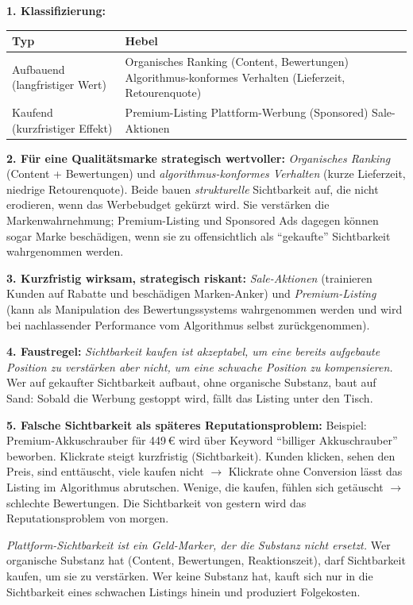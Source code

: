 \documentclass[11pt,a4paper,oneside]{article}
\begin{document}
\begin{loesungbox}
\textbf{1. Klassifizierung:}

\smallskip
\begin{tabularx}{\linewidth}{@{}lX@{}}
\toprule
\textbf{Typ} & \textbf{Hebel} \\
\midrule
Aufbauend (langfristiger Wert)  & Organisches Ranking (Content, Bewertungen) \textperiodcentered{} Algorithmus-konformes Verhalten (Lieferzeit, Retourenquote) \\
\midrule
Kaufend (kurzfristiger Effekt)  & Premium-Listing \textperiodcentered{} Plattform-Werbung (Sponsored) \textperiodcentered{} Sale-Aktionen \\
\bottomrule
\end{tabularx}

\textbf{2. Für eine Qualitätsmarke strategisch wertvoller:}
\emph{Organisches Ranking} (Content + Bewertungen) und \emph{algorithmus-konformes Verhalten} (kurze Lieferzeit, niedrige Retourenquote). Beide bauen \emph{strukturelle} Sichtbarkeit auf, die nicht erodieren, wenn das Werbebudget gekürzt wird. Sie verstärken die Markenwahrnehmung; Premium-Listing und Sponsored Ads dagegen können sogar Marke beschädigen, wenn sie zu offensichtlich als ``gekaufte'' Sichtbarkeit wahrgenommen werden.

\textbf{3. Kurzfristig wirksam, strategisch riskant:}
\emph{Sale-Aktionen} (trainieren Kunden auf Rabatte und beschädigen Marken-Anker) und \emph{Premium-Listing} (kann als Manipulation des Bewertungssystems wahrgenommen werden \textendash{} und wird bei nachlassender Performance vom Algorithmus selbst zurückgenommen).

\textbf{4. Faustregel:}
\emph{Sichtbarkeit kaufen ist akzeptabel, um eine bereits aufgebaute Position zu verstärken \textendash{} aber nicht, um eine schwache Position zu kompensieren.} Wer auf gekaufter Sichtbarkeit aufbaut, ohne organische Substanz, baut auf Sand: Sobald die Werbung gestoppt wird, fällt das Listing unter den Tisch.

\textbf{5. Falsche Sichtbarkeit als späteres Reputationsproblem:}
Beispiel: Premium-Akkuschrauber für 449\,\euro{} wird über Keyword ``billiger Akkuschrauber'' beworben. Klickrate steigt kurzfristig (Sichtbarkeit). Kunden klicken, sehen den Preis, sind enttäuscht, viele kaufen nicht $\rightarrow$ Klickrate ohne Conversion lässt das Listing im Algorithmus abrutschen. Wenige, die kaufen, fühlen sich getäuscht $\rightarrow$ schlechte Bewertungen. Die Sichtbarkeit von gestern wird das Reputationsproblem von morgen.

\begin{merkbox}
\emph{Plattform-Sichtbarkeit ist ein Geld-Marker, der die Substanz nicht ersetzt.} Wer organische Substanz hat (Content, Bewertungen, Reaktionszeit), darf Sichtbarkeit kaufen, um sie zu verstärken. Wer keine Substanz hat, kauft sich nur in die Sichtbarkeit eines schwachen Listings hinein \textendash{} und produziert Folgekosten.
\end{merkbox}
\end{loesungbox}
\end{document}
